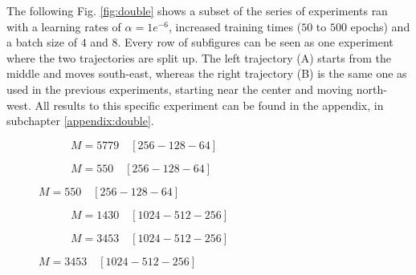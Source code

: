 \par
The following Fig. \ref{fig:double} shows a subset of the series of experiments ran with a learning rates of $\alpha=1e^{-6}$, increased training times ($50$ to $500$ epochs) and a batch size of $4$ and $8$. Every row of subfigures can be seen as one experiment where the two trajectories are split up. The left trajectory (A) starts from the middle and moves south-east, whereas the right trajectory (B) is the same one as used in the previous experiments, starting near the center and moving north-west. All results to this specific experiment can be found in the appendix, in subchapter \ref{appendix:double}.
\begin{figure}[H]
     \centering
     \begin{subfigure}[b]{0.48\textwidth}
         \centering
             
         \caption{$M=5779  \quad [256-128-64]$}
         \label{fig:double3}
     \end{subfigure}
          \hfill
               \begin{subfigure}[b]{0.48\textwidth}
         \centering
             
         \caption{$M=550 \quad [256-128-64]$}
         \label{fig:double4}
     \end{subfigure}
\end{figure}
\begin{figure}[H]\ContinuedFloat
     \begin{subfigure}[b]{0.48\textwidth}
         \centering
       
         \caption{$M=1430  \quad [1024-512-256]$}
         \label{fig:double1}
     \end{subfigure}
     \hfill
     \begin{subfigure}[b]{0.48\textwidth}
         \centering
             
         \caption{$M=3453  \quad [1024-512-256] $}
         \label{fig:double2}
     \end{subfigure}
\end{figure}
